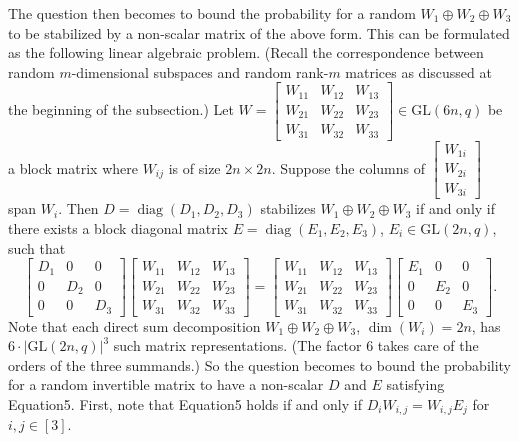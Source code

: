 \documentclass[10pt,a4paper]{article}
\begin{document}
The question then becomes to bound the probability for a random $W_1\oplus W_2\oplus W_3$ to be stabilized by a non-scalar matrix of the above form. This can be formulated as the following linear algebraic problem. (Recall the correspondence between random $m$-dimensional subspaces and random rank-$m$ matrices as discussed at the beginning of the subsection.) Let $W=\begin{bmatrix}W_{11}&W_{12}&W_{13}\\W_{21}&W_{22}&W_{23}\\W_{31}&W_{32}&W_{33}\end{bmatrix}\in\mathrm{GL}(6n,q)$ be a block matrix where $W_{ij}$ is of size $2n\times2n$. Suppose the columns of $\begin{bmatrix}W_{1i}\\W_{2i}\\W_{3i}\end{bmatrix}$ span $W_i$. Then $D=\operatorname{diag}(D_1,D_2,D_3)$ stabilizes $W_1\oplus W_2\oplus W_3$ if and only if there exists a block diagonal matrix $E=\operatorname{diag}(E_1,E_2,E_3)$, $E_i\in\mathrm{GL}(2n,q)$, such that
\begin{equation}\tag{5}
\begin{bmatrix}D_1&0&0\\0&D_2&0\\0&0&D_3\end{bmatrix}\begin{bmatrix}W_{11}&W_{12}&W_{13}\\W_{21}&W_{22}&W_{23}\\W_{31}&W_{32}&W_{33}\end{bmatrix}=\begin{bmatrix}W_{11}&W_{12}&W_{13}\\W_{21}&W_{22}&W_{23}\\W_{31}&W_{32}&W_{33}\end{bmatrix}\begin{bmatrix}E_1&0&0\\0&E_2&0\\0&0&E_3\end{bmatrix}.
\end{equation}
Note that each direct sum decomposition $W_1\oplus W_2\oplus W_3$, $\dim(W_i)=2n$, has $6\cdot|\mathrm{GL}(2n,q)|^3$ such matrix representations. (The factor 6 takes care of the orders of the three summands.) So the question becomes to bound the probability for a random invertible matrix to have a non-scalar $D$ and $E$ satisfying Equation5.
First, note that Equation5 holds if and only if $D_iW_{i,j}=W_{i,j}E_j$ for $i,j\in[3]$.
\end{document}
